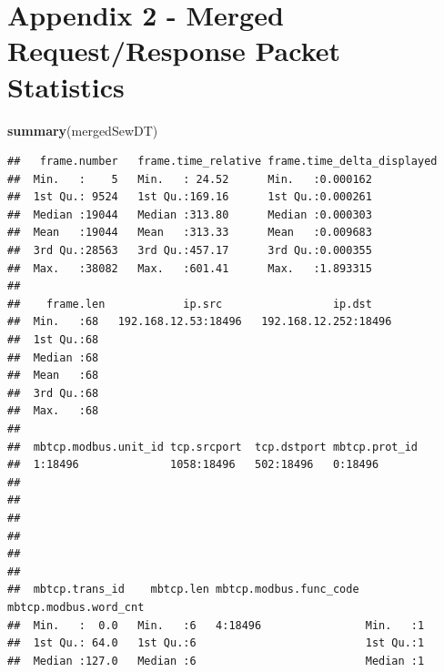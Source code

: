 \documentclass[]{article}
\newenvironment{Shaded}{\begin{snugshade}}{\end{snugshade}}
\newcommand{\KeywordTok}[1]{\textcolor[rgb]{0.13,0.29,0.53}{\textbf{{#1}}}}
\newcommand{\NormalTok}[1]{{#1}}
\begin{document}
\pagebreak

\section{Appendix 2 - Merged Request/Response Packet
Statistics}\label{appendix-2---merged-requestresponse-packet-statistics}

\begin{Shaded}
\begin{Highlighting}[]
\KeywordTok{summary}\NormalTok{(mergedSewDT)}
\end{Highlighting}
\end{Shaded}

\begin{verbatim}
##   frame.number   frame.time_relative frame.time_delta_displayed
##  Min.   :    5   Min.   : 24.52      Min.   :0.000162          
##  1st Qu.: 9524   1st Qu.:169.16      1st Qu.:0.000261          
##  Median :19044   Median :313.80      Median :0.000303          
##  Mean   :19044   Mean   :313.33      Mean   :0.009683          
##  3rd Qu.:28563   3rd Qu.:457.17      3rd Qu.:0.000355          
##  Max.   :38082   Max.   :601.41      Max.   :1.893315          
##                                                                
##    frame.len            ip.src                 ip.dst     
##  Min.   :68   192.168.12.53:18496   192.168.12.252:18496  
##  1st Qu.:68                                               
##  Median :68                                               
##  Mean   :68                                               
##  3rd Qu.:68                                               
##  Max.   :68                                               
##                                                           
##  mbtcp.modbus.unit_id tcp.srcport  tcp.dstport mbtcp.prot_id
##  1:18496              1058:18496   502:18496   0:18496      
##                                                             
##                                                             
##                                                             
##                                                             
##                                                             
##                                                             
##  mbtcp.trans_id    mbtcp.len mbtcp.modbus.func_code mbtcp.modbus.word_cnt
##  Min.   :  0.0   Min.   :6   4:18496                Min.   :1            
##  1st Qu.: 64.0   1st Qu.:6                          1st Qu.:1            
##  Median :127.0   Median :6                          Median :1            

\end{verbatim}
\end{document}
